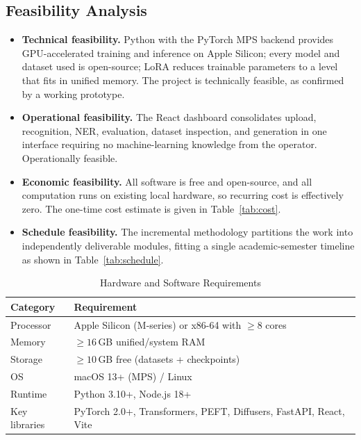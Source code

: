 \documentclass[12pt,a4paper]{report}
\begin{document}
\subsection{Feasibility Analysis}
\begin{itemize}[itemsep=2pt]
  \item \textbf{Technical feasibility.} Python with the PyTorch MPS backend provides GPU-accelerated training and inference on Apple Silicon; every model and dataset used is open-source; LoRA reduces trainable parameters to a level that fits in unified memory. The project is technically feasible, as confirmed by a working prototype.
  \item \textbf{Operational feasibility.} The React dashboard consolidates upload, recognition, NER, evaluation, dataset inspection, and generation in one interface requiring no machine-learning knowledge from the operator. Operationally feasible.
  \item \textbf{Economic feasibility.} All software is free and open-source, and all computation runs on existing local hardware, so recurring cost is effectively zero. The one-time cost estimate is given in Table~\ref{tab:cost}.
  \item \textbf{Schedule feasibility.} The incremental methodology partitions the work into independently deliverable modules, fitting a single academic-semester timeline as shown in Table~\ref{tab:schedule}.
\end{itemize}

\begin{table}[htbp]
\centering
\caption{Hardware and Software Requirements}
\small
\begin{tabular}{p{3.5cm}p{9.5cm}}
\toprule
\textbf{Category} & \textbf{Requirement} \\
\midrule
Processor & Apple Silicon (M-series) or x86-64 with $\geq 8$ cores \\
Memory & $\geq 16$\,GB unified/system RAM \\
Storage & $\geq 10$\,GB free (datasets + checkpoints) \\
OS & macOS 13+ (MPS) / Linux \\
Runtime & Python 3.10+, Node.js 18+ \\
Key libraries & PyTorch 2.0+, Transformers, PEFT, Diffusers, FastAPI, React, Vite \\
\bottomrule
\end{tabular}
\end{table}
\end{document}
